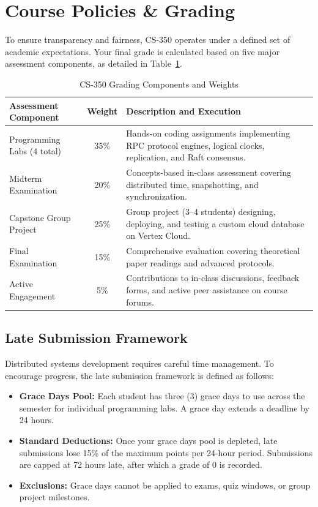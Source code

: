 \section{Course Policies \& Grading}

To ensure transparency and fairness, CS-350 operates under a defined set of academic expectations. Your final grade is calculated based on five major assessment components, as detailed in Table~\ref{tab:grading}.

\begin{table}[H]
\centering
\caption{CS-350 Grading Components and Weights}
\label{tab:grading}
\begin{tabular}{lcp{8.5cm}}
\toprule
\textbf{Assessment Component} & \textbf{Weight} & \textbf{Description and Execution} \\
\midrule
Programming Labs (4 total) & 35\% & Hands-on coding assignments implementing RPC protocol engines, logical clocks, replication, and Raft consensus. \\
Midterm Examination & 20\% & Concepts-based in-class assessment covering distributed time, snapshotting, and synchronization. \\
Capstone Group Project & 25\% & Group project (3--4 students) designing, deploying, and testing a custom cloud database on Vertex Cloud. \\
Final Examination & 15\% & Comprehensive evaluation covering theoretical paper readings and advanced protocols. \\
Active Engagement & 5\% & Contributions to in-class discussions, feedback forms, and active peer assistance on course forums. \\
\bottomrule
\end{tabular}
\end{table}

\subsection{Late Submission Framework}

Distributed systems development requires careful time management. To encourage progress, the late submission framework is defined as follows:
\begin{itemize}
    \item \textbf{Grace Days Pool:} Each student has three (3) grace days to use across the semester for individual programming labs. A grace day extends a deadline by 24 hours.
    \item \textbf{Standard Deductions:} Once your grace days pool is depleted, late submissions lose 15\% of the maximum points per 24-hour period. Submissions are capped at 72 hours late, after which a grade of 0 is recorded.
    \item \textbf{Exclusions:} Grace days cannot be applied to exams, quiz windows, or group project milestones.
\end{itemize}

